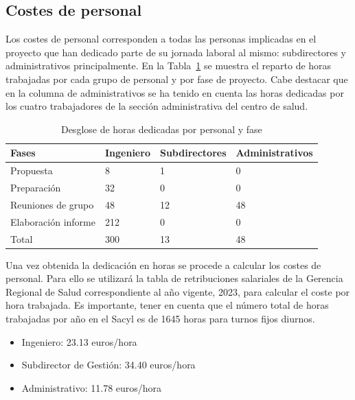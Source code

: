 \subsection{Costes de personal}

Los costes de personal corresponden a todas las personas implicadas en el proyecto que han dedicado parte de su jornada laboral al mismo: subdirectores y administrativos principalmente.
En la Tabla~\ref{tab:horas-trabajadas} se muestra el reparto de horas trabajadas por cada grupo de personal y por fase de proyecto.
Cabe destacar que en la columna de administrativos se ha tenido en cuenta las horas dedicadas por los cuatro trabajadores de la sección administrativa del centro de salud.

\begin{table}[H]
    \centering
    \begin{tabular}{llll}
        \toprule
        Fases               & Ingeniero & Subdirectores & Administrativos \\
        \midrule
        Propuesta           & 8         & 1             & 0               \\
        Preparación         & 32        & 0             & 0               \\
        Reuniones de grupo  & 48        & 12            & 48              \\
        Elaboración informe & 212       & 0             & 0               \\
        \midrule
        Total               & 300       & 13            & 48              \\
        \bottomrule
    \end{tabular}
    \caption{Desglose de horas dedicadas por personal y fase}
    \label{tab:horas-trabajadas}
\end{table}

Una vez obtenida la dedicación en horas se procede a calcular los costes de personal. Para ello se utilizará la tabla de retribuciones salariales de la Gerencia Regional de Salud correspondiente al año vigente, 2023, para calcular el coste por hora trabajada. Es importante, tener en cuenta que el número total de horas trabajadas por año en el Sacyl es de 1645 horas para turnos fijos diurnos.

\begin{itemize}
    \item Ingeniero: 23.13 euros/hora
    \item Subdirector de Gestión: 34.40 euros/hora
    \item Administrativo: 11.78 euros/hora
\end{itemize}

